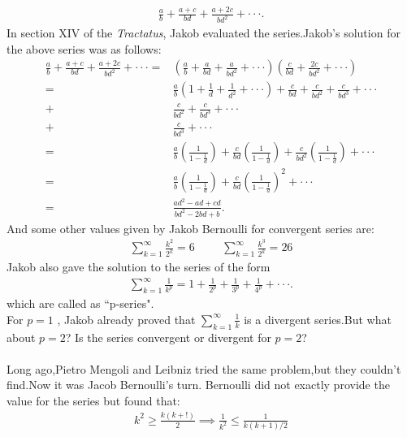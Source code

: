 \documentclass[a4paper,reqno,11pt]{book}
\theoremstyle{plain}%
\theoremstyle{definition}
\begin{document}
\begin{eqnarray*}
    \frac{a}{b}+\frac{a+c}{bd}+\frac{a+2c}{bd^2}+\cdot\cdot\cdot.
\end{eqnarray*}
In section XIV of the \textit{Tractatus}, Jakob evaluated the series.Jakob's solution for the above series was as follows:\\
\begin{align*}
    \frac{a}{b}+\frac{a+c}{bd}+\frac{a+2c}{bd^2}+\cdot\cdot\cdot=&\left(\frac{a}{b}+\frac{a}{bd}+\frac{a}{bd^2}+\cdot\cdot\cdot\right)\left(\frac{c}{bd}+\frac{2c}{bd^2}+\cdot\cdot\cdot\right)\\
    =&\frac{a}{b}\left(1+\frac{1}{d}+\frac{1}{d^2}+\cdot\cdot\cdot\right)+\frac{c}{bd}+\frac{c}{bd^2}+\frac{c}{bd^3}+\cdot\cdot\cdot\\
     +&\frac{c}{bd^2}+\frac{c}{bd^3}+\cdot\cdot\cdot\\
     +&\frac{c}{bd^3}+\cdot\cdot\cdot\\
   =&\frac{a}{b}\left(\frac{1}{1-\frac{1}{d}}\right)+\frac{c}{bd}\left(\frac{1}{1-\frac{1}{d}}\right)+\frac{c}{bd^2}\left(\frac{1}{1-\frac{1}{d}}\right)+\cdot\cdot\cdot\\
   =&\frac{a}{b}\left(\frac{1}{1-\frac{1}{d}}\right)+\frac{c}{bd}\left(\frac{1}{1-\frac{1}{d}}\right)^2+\cdot\cdot\cdot\\
   =&\frac{ad^2-ad+cd}{bd^2-2bd+b}.
\end{align*}
And some other values given by Jakob Bernoulli for convergent series are:
\begin{eqnarray*}
    \sum_{k=1}^{\infty}\frac{k^2}{2^k}=6 \hspace{1cm} \sum_{k=1}^{\infty}\frac{k^3}{2^k}=26
\end{eqnarray*}
Jakob also gave the solution to the series of the form 
\begin{eqnarray*}
    \sum_{k=1}^{\infty}\frac{1}{k^p}=1+\frac{1}{2^p}+\frac{1}{3^p}+\frac{1}{4^p}+\cdot\cdot\cdot.
\end{eqnarray*}
which are called as ``p-series".\\
For $p=1$ , Jakob already proved that $\sum_{k=1}^{\infty}\frac{1}{k}$ is a divergent series.But what about $p=2$? Is the series convergent or divergent for $p=2$?\\
\\
Long ago,Pietro Mengoli and Leibniz tried the same problem,but they couldn't find.Now it was Jacob Bernoulli's turn.
Bernoulli did not exactly provide the value for the series but found that:
\begin{eqnarray*}
    k^2\geq\frac{k(k+!)}{2} \implies \frac{1}{k^2}\leq\frac{1}{k(k+1)/2}
\end{eqnarray*}
\end{document}
